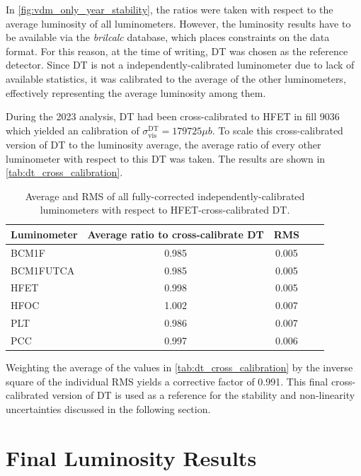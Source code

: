 In \autoref{fig:vdm_only_year_stability}, the ratios were taken with respect to the average luminosity of all luminometers. However, the luminosity results have to be available via the \textit{brilcalc} database, which places constraints on the data format. For this reason, at the time of writing, DT was chosen as the reference detector. Since DT is not a independently-calibrated luminometer due to lack of available statistics, it was calibrated to the average of the other luminometers, effectively representing the average luminosity among them.

During the 2023 analysis, DT had been cross-calibrated to HFET in fill 9036 which yielded an calibration of $\sigma^{\text{DT}}_{\mathrm{vis}} = 179725 \mu b$. To scale this cross-calibrated version of DT to the luminosity average, the average ratio of every other luminometer with respect to this DT was taken. The results are shown in \autoref{tab:dt_cross_calibration}.

\begin{table}[!htb]
	\caption{Average and RMS of all fully-corrected independently-calibrated luminometers with respect to HFET-cross-calibrated DT.}
	
	\label{tab:dt_cross_calibration}
	\centering
	\begin{tabular}{lcccc}
		\hline
		Luminometer & Average ratio to cross-calibrate DT & RMS \\
		\hline
		BCM1F     & 0.985 & 0.005 \\
		BCM1FUTCA & 0.985 & 0.005 \\
		HFET      & 0.998 & 0.005 \\
		HFOC      & 1.002 & 0.007 \\
		PLT       & 0.986 & 0.007 \\
		PCC       & 0.997 & 0.006 \\
		\hline
	\end{tabular}
\end{table}

Weighting the average of the values in \autoref{tab:dt_cross_calibration} by the inverse square of the individual RMS yields a corrective factor of 0.991. This final cross-calibrated version of DT is used as a reference for the stability and non-linearity uncertainties discussed in the following section.

\section{Final Luminosity Results}

